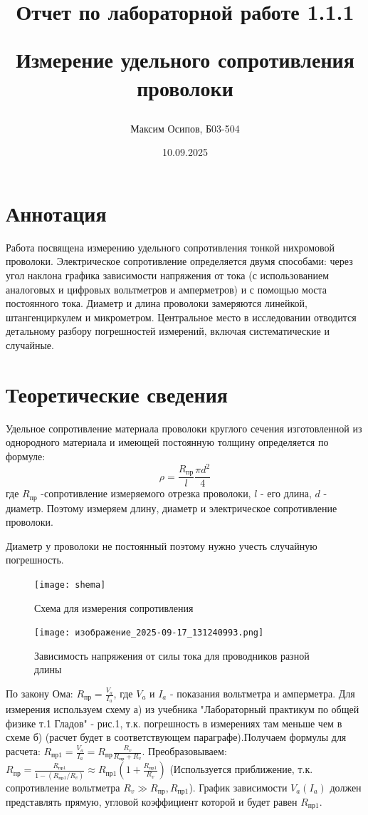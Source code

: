 \documentclass[a4paper]{article}
\title{Отчет по лабораторной работе 1.1.1

Измерение удельного сопротивления проволоки}
\author{Максим Осипов, Б03-504}
\date{10.09.2025}
\begin{document}
\maketitle

\section{Аннотация}

Работа посвящена измерению удельного сопротивления тонкой нихромовой проволоки. Электрическое сопротивление определяется двумя способами: через угол наклона графика зависимости напряжения от тока (с использованием аналоговых и цифровых вольтметров и амперметров) и с помощью моста постоянного тока. Диаметр и длина проволоки замеряются линейкой, штангенциркулем и микрометром. Центральное место в исследовании отводится детальному разбору погрешностей измерений, включая систематические и случайные.

\section{Теоретические сведения}

Удельное сопротивление материала проволоки круглого сечения изготовленной из однородного материала и имеющей постоянную толщину определяется по формуле:
\[ \rho = \frac{R_\text{пр}}{l}\frac{\pi d^2}{4}  \]
где $R_\text{пр}$ -сопротивление измеряемого отрезка проволоки, $l$ - его длина, $d$ - диаметр.
Поэтому измеряем длину, диаметр и электрическое сопротивление проволоки.\par
Диаметр у проволоки не постоянный поэтому нужно учесть случайную погрешность.
\begin{figure}[h!]
    \centering
    \texttt{[image: shema]}
    \caption{Схема для измерения сопротивления}
\end{figure}

\begin{figure}[h]
\centering
\texttt{[image: изображение\_2025-09-17\_131240993.png]}
\caption{Зависимость напряжения от силы тока для проводников разной длины}
\label{fig:voltage_current}
\end{figure}

По закону Ома: $R_\text{пр} = \frac{V_{a}}{I_{a}}$, где $V_{a}$ и $I_{a}$ - показания вольтметра и амперметра. Для измерения используем схему а) из учебника "Лабораторный практикум по общей физике т.1 Гладов" - рис.1, т.к. погрешность в измерениях там меньше чем в схеме б) (расчет будет в соответствующем параграфе).Получаем формулы для расчета: $R_\text{пр1} = \frac{V_{a}}{I_{a}} = R_\text{пр}\frac{R_{v}}{R_\text{пр} + R_{v}}$. Преобразовываем: $ R_\text{пр} = \frac{R_\text{пр1}}{1-(R_\text{пр1}/R_{v})} \approx R_\text{пр1}(1 + \frac{R_\text{пр1}}{R_{v}})$ (Используется приближение, т.к. сопротивление вольтметра $R_{v} \gg R_\text{пр},R_\text{пр1}$).\newline
График зависимости $V_{a}(I_{a})$ должен представлять прямую, угловой коэффициент которой и будет равен $R_{пр1}$.
\end{document}

